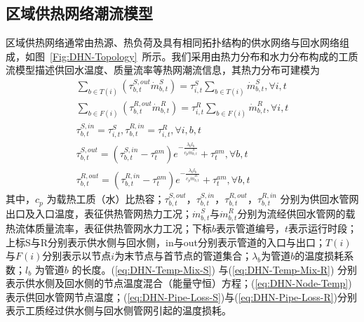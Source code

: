 \subsection{区域供热网络潮流模型}
\label{sec:st-case-dispatch-DHN}
区域供热网络通常由热源、热负荷及具有相同拓扑结构的供水网络与回水网络组成，如图~\ref{Fig:DHN-Topology}~所示。我们采用由热力分布和水力分布构成的工质流模型描述供回水温度、质量流率等热网潮流信息，其热力分布可建模为\cite{LXZ-DHN-2016, DHN-Model-17}
\begin{subequations}
\label{eq:DHN-Thermal-Part}
\begin{gather}
\sum\limits_{b \in T(i)} {({\tau _{b,t}^{S,out}\dot m_{b,t}^S})}  = \tau _{i,t}^S\sum\limits_{b \in T(i)}{\dot m_{b,t}^S} ,\forall i,t \label{eq:DHN-Temp-Mix-S}\\
\sum\limits_{b \in F(i)} {({\tau _{b,t}^{R,out}\dot m_{b,t}^R})}  = \tau _{i,t}^R\sum\limits_{b \in F(i)}{\dot m_{b,t}^R} ,\forall i,t\label{eq:DHN-Temp-Mix-R}\\
\tau _{b,t}^{S,in} = \tau _{i,t}^S,\tau _{b,t}^{R,in} = \tau _{i,t}^R,\forall i,b,t \label{eq:DHN-Node-Temp}\\
\tau _{b,t}^{S,out} = ({\tau _{b,t}^{S,in} - \tau _t^{am}}){e^{-\frac{{{\lambda _b} {l_b}}}{{{c_p} \dot m_{b,t}^S}}}} + \tau _t^{am},\forall b,t\label{eq:DHN-Pipe-Loss-S}\\
\tau _{b,t}^{R,out} = ({\tau _{b,t}^{R,in} - \tau _t^{am}}){e^{ - \frac{{{\lambda _b}{l_b}}}{{{c_p}\dot m_{b,t}^R}}}} + \tau _t^{am},\forall b,t \label{eq:DHN-Pipe-Loss-R}
\end{gather}
\end{subequations}
其中，${c_p}$ 为载热工质（水）比热容；$\tau _{b,t}^{S,out}$，$\tau _{b,t}^{S,in}$，$\tau _{b,t}^{R,out}$，$\tau _{b,t}^{R,in}$ 分别为供回水管网出口及入口温度，表征供热管网热力工况；$\dot m_{b,t}^S$与$\dot m_{b,t}^R$分别为流经供回水管网的载热流体质量流率，表征供热管网水力工况；下标$b$表示管道编号，$t$表示运行时段；上标S与R分别表示供水侧与回水侧，in与out分别表示管道的入口与出口；$T(i)$ 与$F(i)$分别表示以节点$i$为末节点与首节点的管道集合；$\lambda_b$为管道$b$的温度损耗系数；$l_b$ 为管道$b$ 的长度。(\ref{eq:DHN-Temp-Mix-S}) 与(\ref{eq:DHN-Temp-Mix-R}) 分别表示供水侧及回水侧的节点温度混合（能量守恒）方程；(\ref{eq:DHN-Node-Temp}) 表示供回水管网节点温度；(\ref{eq:DHN-Pipe-Loss-S})与(\ref{eq:DHN-Pipe-Loss-R})分别表示工质经过供水侧与回水侧管网引起的温度损耗。

